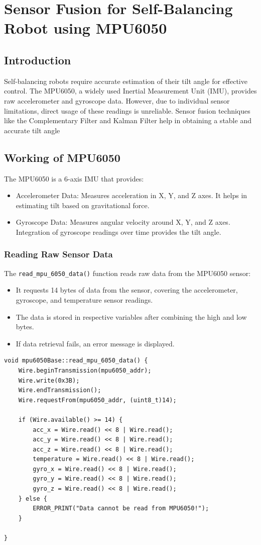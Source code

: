 \section{Sensor Fusion for Self-Balancing Robot using MPU6050}
\subsection{Introduction}
Self-balancing robots require accurate estimation of their tilt angle for effective control. The MPU6050, a widely used Inertial Measurement Unit (IMU), provides raw accelerometer and gyroscope data. However, due to individual sensor limitations, direct usage of these readings is unreliable. Sensor fusion techniques like the Complementary Filter and Kalman Filter help in obtaining a stable and accurate tilt angle

\subsection{Working of MPU6050}
The MPU6050 is a 6-axis IMU that provides:
\begin{itemize}
	\item Accelerometer Data: Measures acceleration in X, Y, and Z axes. It helps in estimating tilt based on gravitational force.
	\item Gyroscope Data: Measures angular velocity around X, Y, and Z axes. Integration of gyroscope readings over time provides the tilt angle.
\end{itemize}

\subsubsection{Reading Raw Sensor Data}
The \texttt{read\_mpu\_6050\_data()} function reads raw data from the MPU6050 sensor:
\begin{itemize}
	\item It requests 14 bytes of data from the sensor, covering the accelerometer, gyroscope, and temperature sensor readings.
	\item The data is stored in respective variables after combining the high and low bytes. 
	\item If data retrieval fails, an error message is displayed.
\end{itemize}
\begin{lstlisting}[style=cppstyle2]
void mpu6050Base::read_mpu_6050_data() {
	Wire.beginTransmission(mpu6050_addr);
	Wire.write(0x3B);
	Wire.endTransmission();
	Wire.requestFrom(mpu6050_addr, (uint8_t)14);
	
	if (Wire.available() >= 14) {
		acc_x = Wire.read() << 8 | Wire.read();
		acc_y = Wire.read() << 8 | Wire.read();
		acc_z = Wire.read() << 8 | Wire.read();
		temperature = Wire.read() << 8 | Wire.read();
		gyro_x = Wire.read() << 8 | Wire.read();
		gyro_y = Wire.read() << 8 | Wire.read();
		gyro_z = Wire.read() << 8 | Wire.read();
	} else {
		ERROR_PRINT("Data cannot be read from MPU6050!");
	}
	
}
\end{lstlisting}

